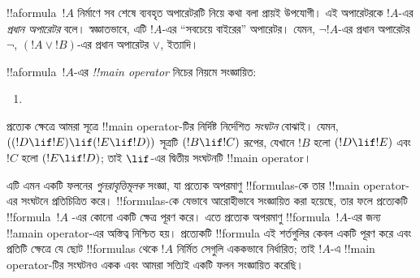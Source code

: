 \documentclass[../../../include/open-logic-section]{subfiles}
\begin{document}


\begin{explain}
!!a{formula}~$!A$ নির্মাণে সব শেষে ব্যবহৃত অপারেটরটি নিয়ে কথা বলা
প্রায়ই উপযোগী। এই অপারেটরকে $!A$-এর \emph{প্রধান অপারেটর} বলে।
স্বজ্ঞাতভাবে, এটি $!A$-এর “সবচেয়ে বাইরের” অপারেটর। যেমন,
$\lnot !A$-এর প্রধান অপারেটর $\lnot$, $(!A \lor !B)$-এর প্রধান
অপারেটর $\lor$, ইত্যাদি।
\end{explain}


\begin{defn}
!!a{formula}~$!A$-এর \emph{!!{main operator}} নিচের নিয়মে সংজ্ঞায়িত:
\begin{enumerate}
\item {}







\end{enumerate}
\end{defn}

প্রত্যেক ক্ষেত্রে আমরা সূত্রে !!{main operator}-টির নির্দিষ্ট নির্দেশিত
\emph{সংঘটন} বোঝাই। যেমন, $((!D \lif !E) \lif (!E \lif !D))$ সূত্রটি
$(!B \lif !C)$ রূপের, যেখানে $!B$ হলো $(!D \lif !E)$ এবং $!C$ হলো
$(!E \lif !D)$; তাই $\lif$-এর দ্বিতীয় সংঘটনটি !!{main operator}।

\begin{explain}
এটি এমন একটি ফলনের \emph{পুনরাবৃত্তিমূলক} সংজ্ঞা, যা প্রত্যেক
অপরমাণু !!{formula}s-কে তার !!{main operator}-এর সংঘটনে প্রতিচিত্রিত
করে। !!{formula}s-কে যেভাবে আরোহীভাবে সংজ্ঞায়িত করা হয়েছে, তার ফলে
প্রত্যেকটি !!{formula}~$!A$ -এর কোনো একটি ক্ষেত্র
পূরণ করে। এতে প্রত্যেক অপরমাণু !!{formula}~$!A$-এর জন্য !!a{main operator}-এর অস্তিত্ব নিশ্চিত হয়। প্রত্যেকটি !!{formula} এই
শর্তগুলির কেবল একটি পূরণ করে এবং প্রতিটি ক্ষেত্রে যে ছোট
!!{formula}s থেকে $!A$ নির্মিত সেগুলি এককভাবে নির্ধারিত; তাই $!A$-এ
!!{main operator}-টির সংঘটনও একক এবং আমরা সত্যিই একটি ফলন সংজ্ঞায়িত
করেছি।
\end{explain}
\end{document}
